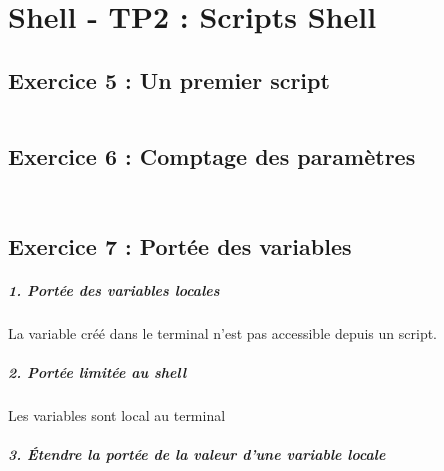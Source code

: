 \chapter{Shell - TP2 : Scripts Shell}
    \section{Exercice 5 : Un premier script}
        \inputminted[linenos]{shell}{../sources/shell/TP2/ex5.sh}
    \section{Exercice 6 : Comptage des paramètres}
        \inputminted[linenos]{shell}{../sources/shell/TP2/ex6-parametres.sh}
        \inputminted[linenos]{shell}{../sources/shell/TP2/ex6-parametres2.sh}
    \section{Exercice 7 : Portée des variables}
        \paragraph{1. Portée des variables locales}
            La variable créé dans le terminal n'est pas accessible depuis un script.
        \paragraph{2. Portée limitée au shell}
            Les variables sont local au terminal
        \paragraph{3. Étendre la portée de la valeur d’une variable locale}
